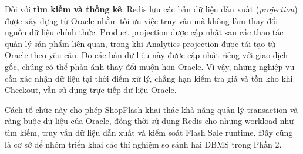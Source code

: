Đối với \textbf{tìm kiếm và thống kê}, Redis lưu các bản dữ liệu dẫn xuất (\emph{projection}) được xây dựng từ Oracle nhằm tối ưu việc truy vấn mà không làm thay đổi nguồn dữ liệu chính thức. Product projection được cập nhật sau các thao tác quản lý sản phẩm liên quan, trong khi Analytics projection được tái tạo từ Oracle theo yêu cầu. Do các bản dữ liệu này được cập nhật riêng với giao dịch gốc, chúng có thể phản ánh thay đổi muộn hơn Oracle. Vì vậy, những nghiệp vụ cần xác nhận dữ liệu tại thời điểm xử lý, chẳng hạn kiểm tra giá và tồn kho khi Checkout, vẫn sử dụng trực tiếp dữ liệu Oracle.

Cách tổ chức này cho phép ShopFlash khai thác khả năng quản lý transaction và ràng buộc dữ liệu của Oracle, đồng thời sử dụng Redis cho những workload như tìm kiếm, truy vấn dữ liệu dẫn xuất và kiểm soát Flash Sale runtime. Đây cũng là cơ sở để nhóm triển khai các thí nghiệm so sánh hai DBMS trong Phần 2.
